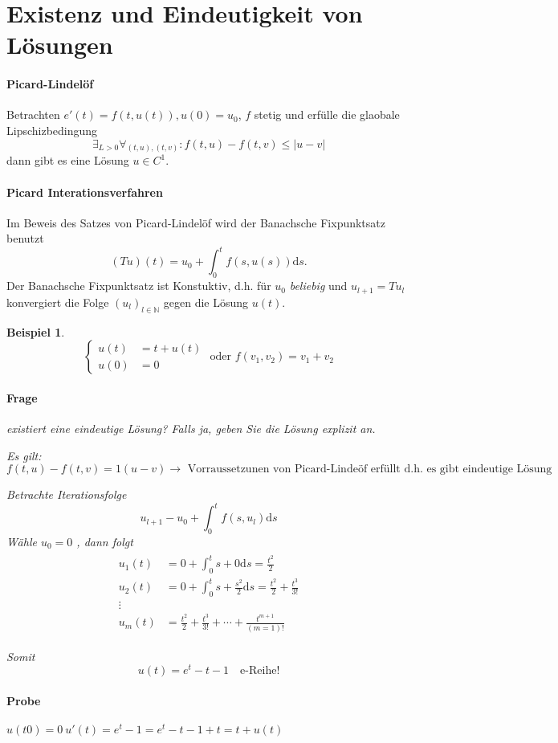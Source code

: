 \documentclass[11pt]{article}
\newcommand{\dd}{\mathrm{d}}
\newcommand{\NN}{\mathbb{N}}
\newcounter{myCounter}[section]
\newtheorem{Bsp}[myCounter]{Beispiel}
\begin{document}
\section{Existenz und Eindeutigkeit von L\"osungen}

\paragraph{Picard-Lindel\"of}
Betrachten $e'(t) = f(t,u(t)), u(0) = u_0$, $f$ stetig und erf\"ulle die glaobale
Lipschizbedingung \[ \exists_{L>0} \forall_{(t,u),(t,v)} : f(t,u) - f(t,v) \leq
|u-v| \] dann gibt es eine L\"osung $u \in C^1$.

\paragraph{Picard Interationsverfahren}
Im Beweis des Satzes von Picard-Lindel\"of wird der Banachsche Fixpunktsatz
benutzt \[ (Tu)(t) = u_0 + \int_0^t f(s,u(s)) \dd s. \]
Der Banachsche Fixpunktsatz ist Konstuktiv, d.h. f\"ur $u_0$ \emph{beliebig}
und $u_{l+1} = Tu_l$ konvergiert die Folge $(u_l)_{l \in \NN}$ gegen die
L\"osung $u(t)$.

\begin{Bsp}
  \[ \left\{\begin{aligned} u(t)&=t+ u(t) \\ u(0) &= 0 \end{aligned} \right.
    \text{ oder } f(v_1,v_2) = v_1 + v_2 \]
  \paragraph{Frage} existiert eine eindeutige L\"osung? Falls ja, geben Sie die
  L\"osung explizit an.

  Es gilt: $f(t,u) - f(t,v) = 1 (u - v) \rightarrow \text{ Vorraussetzunen von
  Picard-Linde\"of erf\"ullt d.h. es gibt eindeutige L\"osung }$

  Betrachte Iterationsfolge \[
    u_{l+1} - u_0 + \int_0^t f(s,u_l) \dd s \]
    W\"ahle $u_ 0 = 0$ , dann folgt
  \begin{align*}
    \begin{matrix}
      u_1(t) &= 0 + \int_0^t s + 0 \dd s = \frac{t^2}{2} \\
      u_2(t) &= 0 + \int_0^t s + \frac{s^2}{2} \dd s = \frac{t^2}{2} + \frac{t^3}{3!} \\
      \vdots \\
      u_m(t) &= \frac{t^2}{2} + \frac{t^3}{3!} + \dotsb + \frac{t^{m+1}}{(m=1)!}
    \end{matrix}
  \end{align*}

  Somit \[ u(t) = e^t - t - 1 \quad \text {e-Reihe!} \]

  \paragraph{Probe} $u(t0) = 0 \ u'(t) = e^t - 1 = e^t - t - 1 + t = t +
  u(t)$
\end{Bsp}
\end{document}
